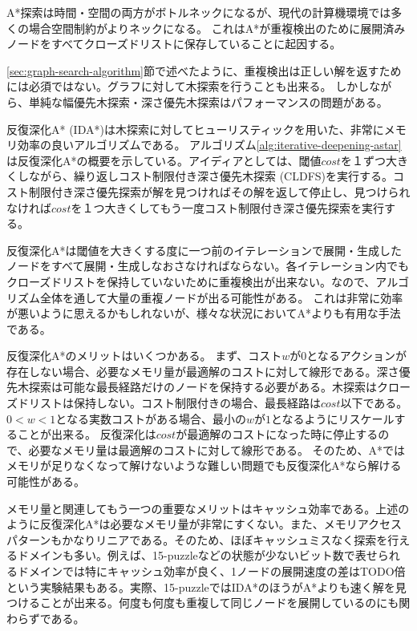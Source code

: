 \documentclass{report}
\begin{document}
A*探索は時間・空間の両方がボトルネックになるが、現代の計算機環境では多くの場合空間制約がよりネックになる。
これはA*が重複検出のために展開済みノードをすべてクローズドリストに保存していることに起因する。

\ref{sec:graph-search-algorithm}節で述べたように、重複検出は正しい解を返すためには必須ではない。グラフに対して木探索を行うことも出来る。
しかしながら、単純な幅優先木探索・深さ優先木探索はパフォーマンスの問題がある。

反復深化A* (IDA*)は木探索に対してヒューリスティックを用いた、非常にメモリ効率の良いアルゴリズムである\cite{korf:85a}。
アルゴリズム\ref{alg:iterative-deepening-astar}は反復深化A*の概要を示している。アイディアとしては、閾値$cost$を１ずつ大きくしながら、繰り返しコスト制限付き深さ優先木探索 (CLDFS)を実行する。コスト制限付き深さ優先探索が解を見つければその解を返して停止し、見つけられなければ$cost$を１つ大きくしてもう一度コスト制限付き深さ優先探索を実行する。

反復深化A*は閾値を大きくする度に一つ前のイテレーションで展開・生成したノードをすべて展開・生成しなおさなければならない。各イテレーション内でもクローズドリストを保持していないために重複検出が出来ない。なので、アルゴリズム全体を通して大量の重複ノードが出る可能性がある。
これは非常に効率が悪いように思えるかもしれないが、様々な状況においてA*よりも有用な手法である。

反復深化A*のメリットはいくつかある。
まず、コスト$w$が0となるアクションが存在しない場合、必要なメモリ量が最適解のコストに対して線形である。深さ優先木探索は可能な最長経路だけのノードを保持する必要がある。木探索はクローズドリストは保持しない。コスト制限付きの場合、最長経路は$cost$以下である。$0<w<1$となる実数コストがある場合、最小の$w$が$1$となるようにリスケールすることが出来る。 反復深化は$cost$が最適解のコストになった時に停止するので、必要なメモリ量は最適解のコストに対して線形である。
そのため、A*ではメモリが足りなくなって解けないような難しい問題でも反復深化A*なら解ける可能性がある。

メモリ量と関連してもう一つの重要なメリットはキャッシュ効率である。上述のように反復深化A*は必要なメモリ量が非常にすくない。また、メモリアクセスパターンもかなりリニアである。そのため、ほぼキャッシュミスなく探索を行えるドメインも多い。例えば、15-puzzleなどの状態が少ないビット数で表せられるドメインでは特にキャッシュ効率が良く、1ノードの展開速度の差はTODO倍という実験結果もある\cite{korf:85a}。実際、15-puzzleではIDA*のほうがA*よりも速く解を見つけることが出来る\cite{korf:85a}。何度も何度も重複して同じノードを展開しているのにも関わらずである。
\end{document}
